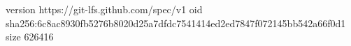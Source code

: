 version https://git-lfs.github.com/spec/v1
oid sha256:6c8ac8930fb5276b8020d25a7dfdc7541414ed2ed7847f072145bb542a66f0d1
size 626416

